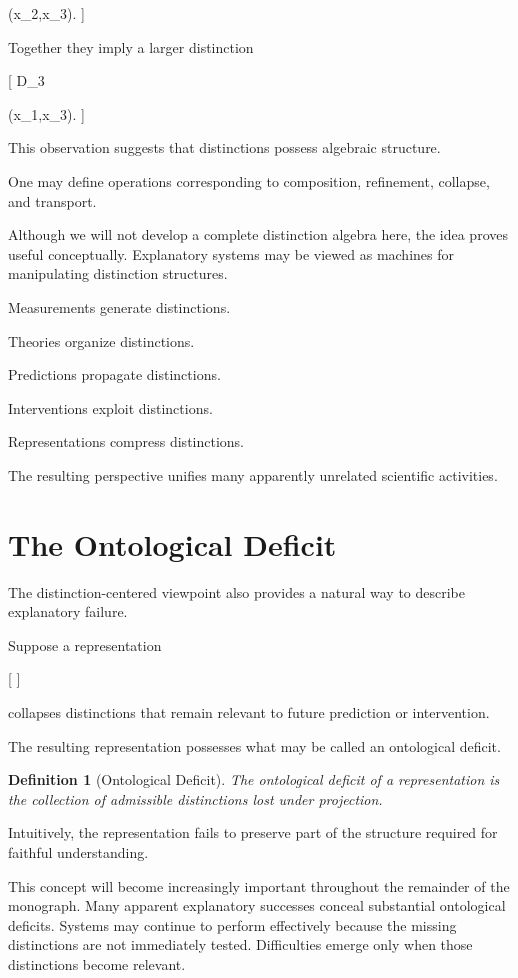 \documentclass[11pt,oneside,openany]{book}
\newtheorem{definition}{Definition}[chapter] \newtheorem{theorem}{Theorem}[chapter] \newtheorem{proposition}{Proposition}[chapter] \newtheorem{lemma}{Lemma}[chapter] \newtheorem{corollary}{Corollary}[chapter] \newtheorem{remark}{Remark}[chapter]
\begin{document}
(x_2,x_3).
]

Together they imply a larger distinction

[
D_3

(x_1,x_3).
]

This observation suggests that distinctions possess algebraic structure.

One may define operations corresponding to composition, refinement, collapse, and transport.

Although we will not develop a complete distinction algebra here, the idea proves useful conceptually. Explanatory systems may be viewed as machines for manipulating distinction structures.

Measurements generate distinctions.

Theories organize distinctions.

Predictions propagate distinctions.

Interventions exploit distinctions.

Representations compress distinctions.

The resulting perspective unifies many apparently unrelated scientific activities.

\section{The Ontological Deficit}

The distinction-centered viewpoint also provides a natural way to describe explanatory failure.

Suppose a representation

[
\pi
]

collapses distinctions that remain relevant to future prediction or intervention.

The resulting representation possesses what may be called an ontological deficit.

\begin{definition}[Ontological Deficit]

The ontological deficit of a representation is the collection of admissible distinctions lost under projection.

\end{definition}

Intuitively, the representation fails to preserve part of the structure required for faithful understanding.

This concept will become increasingly important throughout the remainder of the monograph. Many apparent explanatory successes conceal substantial ontological deficits. Systems may continue to perform effectively because the missing distinctions are not immediately tested. Difficulties emerge only when those distinctions become relevant.
\end{document}
